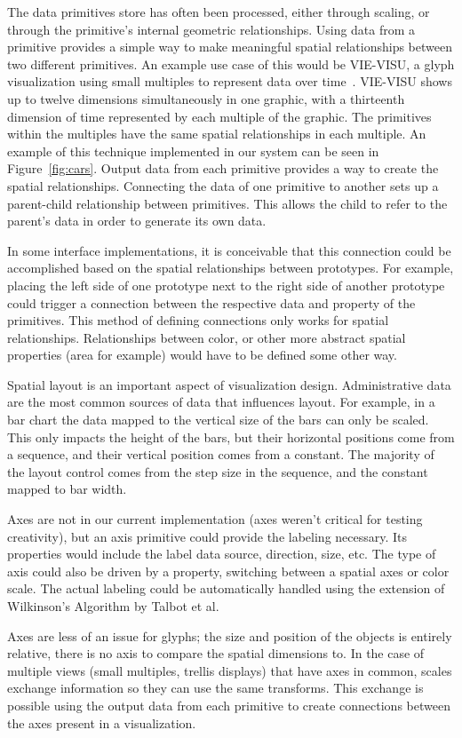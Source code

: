 The data primitives store has often been processed, either through scaling, or through the primitive's internal geometric relationships.
Using data from a primitive provides a simple way to make meaningful spatial relationships between two different primitives.
An example use case of this would be VIE-VISU, a glyph visualization using small multiples to represent data over time~\cite{Horn1998}.
VIE-VISU shows up to twelve dimensions simultaneously in one graphic, with a thirteenth dimension of time represented by each multiple of the graphic.
The primitives within the multiples have the same spatial relationships in each multiple.
An example of this technique implemented in our system can be seen in Figure~\ref{fig:cars}.
Output data from each primitive provides a way to create the spatial relationships.
Connecting the data of one primitive to another sets up a parent-child relationship between primitives.
This allows the child to refer to the parent's data in order to generate its own data.

In some interface implementations, it is conceivable that this connection could be accomplished based on the spatial relationships between prototypes.
For example, placing the left side of one prototype next to the right side of another prototype could trigger a connection between the respective data and property of the primitives.
This method of defining connections only works for spatial relationships. Relationships between color, or other more abstract spatial properties (area for example) would have to be defined some other way.

\label{axesLayout}

Spatial layout is an important aspect of visualization design.
Administrative data are the most common sources of data that influences layout.
For example, in a bar chart the data mapped to the vertical size of the bars can only be scaled.
This only impacts the height of the bars, but their horizontal positions come from a sequence, and their vertical position comes from a constant.
The majority of the layout control comes from the step size in the sequence, and the constant mapped to bar width.

Axes are not in our current implementation (axes weren't critical for testing creativity), but an axis primitive could provide the labeling necessary.
Its properties would include the label data source, direction, size, etc.
The type of axis could also be driven by a property, switching between a spatial axes or color scale.
The actual labeling could be automatically handled using the extension of Wilkinson's Algorithm by Talbot et al.~\cite{Talbot2010}

Axes are less of an issue for glyphs; the size and position of the objects is entirely relative, there is no axis to compare the spatial dimensions to.
In the case of multiple views (small multiples, trellis displays) that have axes in common, scales exchange information so they can use the same transforms.
This exchange is possible using the output data from each primitive to create connections between the axes present in a visualization.